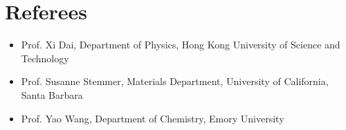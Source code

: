 \section{Referees}

\begin{itemize}
\item Prof. Xi Dai, Department of Physics, Hong Kong University of Science and Technology \\ 
\item Prof. Susanne Stemmer, Materials Department, University of California, Santa Barbara \\
\item Prof. Yao Wang, Department of Chemistry, Emory University \\
\end{itemize}